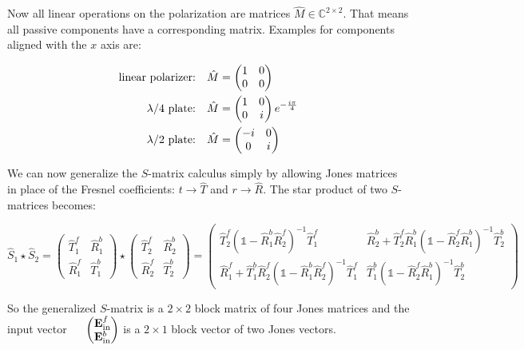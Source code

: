\noindent
Now all linear operations on the polarization are matrices $\hat{M} \in \mathds{C}^{2 \times 2}$. That means all passive components have a corresponding matrix. Examples for components aligned with the $x$ axis are:


\begin{equation}
\begin{split}
   \qq*{linear polarizer:} \hat{M} &=
   \begin{pmatrix}
       1 & 0\\
       0 & 0
   \end{pmatrix}\\
   \qq*{$\lambda / 4$ plate:} \hat{M} &=
   \begin{pmatrix}
       1 & 0\\
       0 & i
   \end{pmatrix}
   e^{-\frac{i \pi}{4}}\\
   \qq*{$\lambda / 2$ plate:} \hat{M} &=
   \begin{pmatrix}
       -i & 0\\
       0 & i
   \end{pmatrix}\\
\end{split}
\end{equation}

We can now generalize the $S$-matrix calculus simply by allowing Jones matrices in place of the Fresnel coefficients: $t \rightarrow \hat T$ and $r \rightarrow \hat R$. The star product of two $S$-matrices becomes:

\begin{equation}\label{eq:bg:star}
    \hat S_1 \star \hat S_2 =
    \begin{pmatrix}
        \hat T^f_1 & \hat R^b_1 \\
        \hat R^f_1 & \hat T^b_1
    \end{pmatrix}
    \star
    \begin{pmatrix}
        \hat T^f_2 & \hat R^b_2 \\
        \hat R^f_2 & \hat T^b_2
    \end{pmatrix}
    =
    \begin{pmatrix}
        \hat T^f_2 (\mathds 1 - \hat R^b_1 \hat R^f_2)^{-1} \hat T^f_1 &
        \hat R^b_2 + \hat T^f_2 \hat R^b_1 (\mathds 1 - \hat R^f_2 \hat R^b_1)^{-1} \hat T^b_2\\
        \hat R^f_1 + \hat T^b_1 \hat R^f_2 (\mathds 1 - \hat R^b_1 \hat R^f_2)^{-1} \hat T^f_1 &
        \hat T^b_1 (\mathds 1 - \hat R^f_2 \hat R^b_1)^{-1} \hat T^b_2
    \end{pmatrix}
\end{equation}

So the generalized $S$-matrix is a $2 \times 2$ block matrix of four Jones matrices and the input vector $\quad $
$
\begin{pmatrix}
    \vb E^f_{\mathrm{in}} \\
    \vb E^b_{\mathrm{in}}
\end{pmatrix}
$
is a $2 \times 1$ block vector of two Jones vectors.
